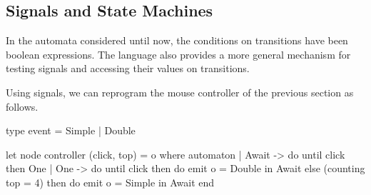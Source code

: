 \documentclass[11pt,titlepage,twoside]{report}
\makeatletter
\newcommand{\zls}[1]{{\@span{class="zelusinline"}#1}}
\newcommand{\zls}[1]{\texttt{#1}}
\renewcommand{\zls}[1]{\texttt{#1}}
\makeatother
\begin{document}




\subsection{Signals and State Machines\label{statemachinesig}} %

In the automata considered until now, the conditions on transitions
have been boolean expressions. The language also provides a more general
mechanism for testing signals and accessing their values on transitions.

Using signals, we can reprogram the mouse controller of the previous section
as follows.
\begin{chklisting}[include=counting,withresult]
type event = Simple | Double

let node controller (click, top) = o where
  automaton
  | Await ->
     do until click then One
  | One ->
     do until click then do emit o = Double in Await
        else (counting top = 4) then do emit o = Simple in Await
  end
\end{chklisting}
\end{document}
